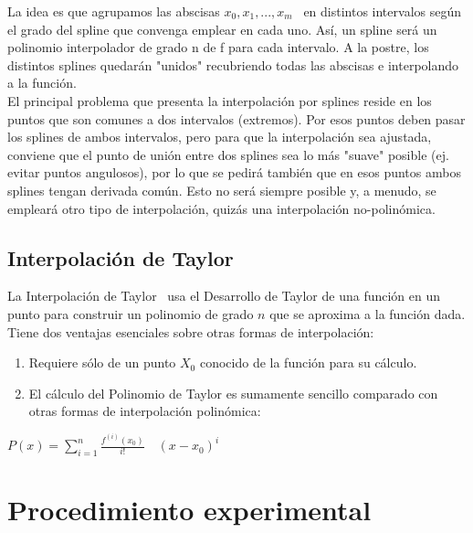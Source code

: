 \documentclass[spanish,a4paper,11pt,twoside]{report}
\begin{document}
La idea es que agrupamos las abscisas $x_0,x_1,...,x_m$ \ en distintos intervalos según el grado del spline que convenga emplear en cada uno. Así, un spline será un polinomio interpolador de grado n de f para cada intervalo. A la postre, los distintos splines quedarán "unidos" recubriendo todas las abscisas e interpolando a la función.\\

El principal problema que presenta la interpolación por splines reside en los puntos que son comunes a dos intervalos (extremos). Por esos puntos deben pasar los splines de ambos intervalos, pero para que la interpolación sea ajustada, conviene que el punto de unión entre dos splines sea lo más "suave" posible (ej. evitar puntos angulosos), por lo que se pedirá también que en esos puntos ambos splines tengan derivada común. Esto no será siempre posible y, a menudo, se empleará otro tipo de interpolación, quizás una interpolación no-polinómica.\\




\section{Interpolación  de Taylor}
\label{2:sec:2}
  La Interpolación de Taylor~\cite{Taylor} usa el Desarrollo de Taylor de una función en un punto para construir un polinomio de grado $n$ que se aproxima a la función dada. Tiene dos ventajas esenciales sobre otras formas de interpolación:
  \begin{enumerate}
  \item
  Requiere sólo de un punto $X_0$ conocido de la función para su cálculo.
  \item
  El cálculo del Polinomio de Taylor es sumamente sencillo comparado con otras formas de interpolación polinómica:
  \end{enumerate}

\begin{center}
$P(x)=\sum\limits_{i=1}^n\frac{f^{(i)} (x_0)}{i!}\quad(x - x_0)^i $
\end{center}  
  
  

\chapter{Procedimiento experimental}
\label{chapter:exp}
\end{document}
